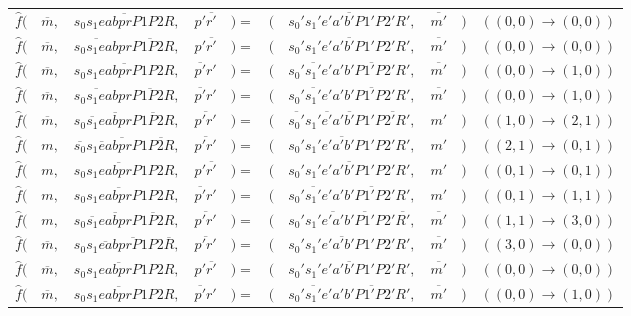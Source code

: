 \vspace{1em}
\begin{tabular}{ r r r l l r r l l l}
	$\hat{f}($ & $\overline{m},$ & $\overline{s_0 s_1eabprP1P2R},$ &$p'\overline{r'}$ & $) =$ & $($ & $\overline{s_0' s_1'e'a'b'P1'P2'R'},$ & $\overline{m'}$ & $)$ & $((0,0) \rightarrow (0,0))$\\
	$\hat{f}($ & $\overline{m},$ & $\overline{s_0 s_1eab}p\overline{rP1P2R},$ &$p'\overline{r'}$ & $) =$ & $($ & $\overline{s_0' s_1'e'a'b'P1'P2'R'},$ & $\overline{m'}$ & $)$ & $((0,0) \rightarrow (0,0))$\\	
	$\hat{f}($ & $\overline{m},$ & $\overline{s_0 s_1 eabp rP1P2R},$ &$\overline{p'}r'$ & $) =$ & $($ & $s_0'\overline{s_1'}e'\overline{a'b'P1'P2'R'},$ & $\overline{m'}$ & $)$ & $((0,0) \rightarrow (1,0))$\\
	$\hat{f}($ & $\overline{m},$ & $\overline{s_0 s_1eab} p \overline{rP1P2R},$ &$\overline{p'}r'$ & $) =$ & $($ & $s_0'\overline{s_1'}e'\overline{a'b'P1'P2'R'},$ & $\overline{m'}$ & $)$ & $((0,0) \rightarrow (1,0))$\\
	$\hat{f}($ & $\overline{m},$ & $s_0\overline{s_1}e\overline{abp} r \overline{P1P2R},$ &$\overline{p'r'}$ & $) =$ & $($ & $\overline{s_0'}s_1'\overline{e'}a'\overline{b'}P1'\overline{P2'R'},$ & $m'$ & $)$ & $((1,0) \rightarrow (2,1))$\\	
	$\hat{f}($ & $m,$ & $\overline{s_0}s_1\overline{e}a\overline{b p r}P1\overline{P2R},$ &$\overline{p'r'}$ & $) =$ & $($ & $\overline{s_0's_1'e'a'b'P1'P2'}R',$ & $m'$ & $)$ & $((2,1) \rightarrow (0,1))$\\	
	$\hat{f}($ & $m,$ & $\overline{s_0s_1eab p rP1P2}R,$ &$p'\overline{r'}$ & $) =$ & $($ & $\overline{s_0's_1'e'a'b'P1'P2'R'},$ & $m'$ & $)$ & $((0,1) \rightarrow (0,1))$\\			
	$\hat{f}($ & $m,$ & $\overline{s_0s_1eab p rP1P2}R,$ &$\overline{p'}r'$ & $) =$ & $($ & $s_0'\overline{s_1'}e'\overline{a'b'P1'P2'R'},$ & $m'$ & $)$ & $((0,1) \rightarrow (1,1))$\\				
	$\hat{f}($ & $m,$ & $s_0\overline{s_1}e\overline{ab p} r\overline{P1P2R},$ &$\overline{p'r'}$ & $) =$ & $($ & $s_0's_1'\overline{e'a'}b'\overline{P1'}P2'\overline{R'},$ & $\overline{m'}$ & $)$ & $((1,1) \rightarrow (3,0))$\\					
	$\hat{f}($ & $\overline{m},$ & $s_0s_1\overline{ea}b\overline{prP1}P2\overline{R},$ &$\overline{p'r'}$ & $) =$ & $($ & $\overline{s_0's_1'e'a'b'P1'P2'}R',$ & $\overline{m'}$ & $)$ & $((3,0) \rightarrow (0,0))$\\						
	$\hat{f}($ & $\overline{m},$ & $\overline{s_0s_1eabprP1P2}R,$ &$p'\overline{r'}$ & $) =$ & $($ & $\overline{s_0's_1'e'a'b'P1'P2'R'},$ & $\overline{m'}$ & $)$ & $((0,0) \rightarrow (0,0))$\\	
	$\hat{f}($ & $\overline{m},$ & $\overline{s_0s_1eabprP1P2}R,$ &$\overline{p'}r'$ & $) =$ & $($ & $s_0'\overline{s_1'}e'\overline{a'b'P1'P2'R'},$ & $\overline{m'}$ & $)$ & $((0,0) \rightarrow (1,0))$\\		
\end{tabular}
\vspace{1em}



